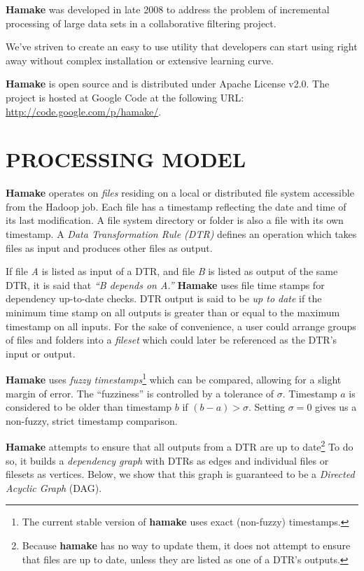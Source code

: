 \documentclass[a4paper,twoside]{article}
\begin{document}
\textbf{Hamake} was developed in late 2008 to address the problem of
incremental processing of large data sets in a collaborative filtering project.

We've striven to create an easy to use utility that developers can
start using right away without complex installation or extensive
learning curve. 

\textbf{Hamake} is open source and is distributed under Apache
License v2.0. The project is hosted at Google Code at the following
URL: \url{http://code.google.com/p/hamake/}.

\section{\uppercase{Processing Model}}

\textbf{Hamake} operates on \textit{files} residing on a local or
distributed file system accessible from the Hadoop job. Each file has a timestamp reflecting the date and time of its
last modification. A file system directory or folder is also a file
with its own timestamp. A \textit{Data Transformation Rule (DTR)}
defines an operation which takes files as input and produces other
files as output.

If file \textit{A} is listed as input of a DTR, and file \textit{B}
is listed as output of the same DTR, it is said that \textit{``B depends
  on A.''} \textbf{Hamake} uses file time stamps for dependency
up-to-date checks. DTR output is said to be \textit{up to date} if the minimum time stamp on all outputs is greater than or equal to the maximum timestamp on all inputs. For the sake of convenience, a user could arrange groups of files and folders into a \emph{fileset} which could later be referenced as the DTR's input or output.

\textbf{Hamake} uses \textit{fuzzy timestamps}\footnote{The current stable
  version of \textbf{hamake} uses exact (non-fuzzy) timestamps.}
which can be compared, allowing for a slight margin of error. The
``fuzziness'' is controlled by a tolerance of $\sigma$. Timestamp $a$ is considered to be older than timestamp $b$ if $(b-a)>\sigma$. Setting $\sigma=0$ gives us a non-fuzzy, strict timestamp comparison.

\textbf{Hamake} attempts to ensure that all outputs from a DTR are up to
date\footnote{Because \textbf{hamake} has no way to update them, it does not attempt to ensure that files are up to date, unless they are listed as one of a DTR's outputs.} To do so, it builds a \textit{dependency graph} with DTRs as edges and individual files or filesets as vertices. Below, we show that this graph is guaranteed to be a \textit{Directed Acyclic Graph} (DAG).
\end{document}
